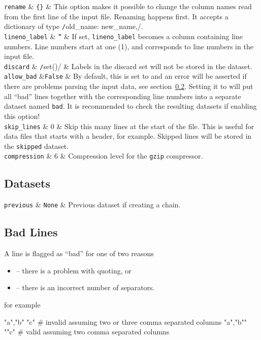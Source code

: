 \RP \texttt{rename} & \texttt{\{\}} & This option makes it possible to
change the column names read from the first line of the input file.
Renaming happens first.  It accepts a dictionary of type
\texttt/{old_name: new_name,}/.\\[1ex]

\RP \texttt{lineno\_label} & \texttt{''} & If set,
\texttt{lineno\_label} becomes a column containing line numbers.
Line numbers start at one (1), and corresponds to line numbers in the
input file.  \\[1ex]

\RP \texttt{discard} & \texttt/set()/ & Labels in the discard set will
not be stored in the dataset.\\[1ex]

\RP \texttt{allow\_bad} &\texttt{False} & By default, this is
set to \pyFalse and an error will be asserted if there are problems
parsing the input data, see section~\ref{sec:csvimport-bad}.  Setting it
to \pyTrue will put all ``bad'' lines together with the corresponding
line numbers into a separate dataset named \texttt{bad}.  It is
recommended to check the resulting datasets if enabling this
option!\\[1ex]

\RP \texttt{skip\_lines} & 0 & Skip this many lines at the start of the file.
This is useful for data files that starts with a header, for
example.  Skipped lines will be stored in the \texttt{skipped} dataset.\\[1ex]

\RP \texttt{compression} & 6 & Compression level for the \texttt{gzip} compressor.
\stoptable



\subsection{Datasets}

\starttable
  \RP \texttt{previous} & \texttt{None} & Previous dataset if creating a
  chain.\\
\stoptable



\subsection{Bad Lines}
\label{sec:csvimport-bad}
A line is flagged as ``bad'' for one of two reasons
\begin{itemize}
\item[] -- there is a problem with quoting, or
\item[] -- there is an incorrect number of separators.
\end{itemize}
for example
\begin{python}
  "a","b" "c"     # invalid assuming two or three comma separated columns
  "a","b"" ""c"   # valid assuming two comma separated columns
\end{python}


